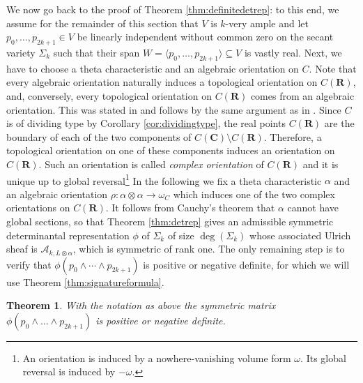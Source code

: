 \documentclass[12pt]{amsart}
\newcounter{thmcounter}
\numberwithin{equation}{section}
\numberwithin{thmcounter}{section}
\newtheorem{theorem}[thmcounter]{Theorem}
\theoremstyle{definition}
\theoremstyle{claim}
\newcommand{\nR}{\mathbf{R}}
\newcommand{\nC}{\mathbf{C}}
\newcommand{\sA}{\mathscr{A}}
\begin{document}
We now go back to the proof of Theorem \ref{thm:definitedetrep}:  to this end, we assume for the remainder of this section that $V$ is $k$-very ample and let $p_0,\ldots,p_{2k+1}\in V$ be linearly independent without common zero on the secant variety $\Sigma_k$ such that their span $W=\langle p_0,\ldots,p_{2k+1} \rangle \subseteq V$ is vastly real. Next, we have to choose a theta characteristic and an algebraic orientation on $C$. Note that every algebraic orientation naturally induces a topological orientation on $C(\nR)$, and, conversely, every topological orientation on $C(\nR)$ comes from an algebraic orientation. This was stated in \cite[Example 4.5]{agostinikummer} and follows by the same argument as in \cite[Corollary 2.4]{tottet}. Since $C$ is of dividing type by Corollary \ref{cor:dividingtype}, the real points $C(\nR)$ are the boundary of each of the two components of $C(\nC)\setminus C(\nR)$. Therefore, a topological orientation on one of these components induces an orientation on $C(\nR)$. Such an orientation is called \emph{complex orientation} of $C(\nR)$ and it is unique up to global reversal\footnote{An orientation is induced by a nowhere-vanishing volume form $\omega$. Its global reversal is induced by $-\omega$.} In the following we fix a theta characteristic $\alpha$ and an algebraic orientation $\rho\colon\alpha\otimes\alpha\to\omega_C$ which induces one of the two complex orientations on $C(\nR)$. It follows from Cauchy's theorem that $\alpha$ cannot have global sections, so that Theorem \ref{thm:detrep} gives an admissible symmetric determinantal representation $\phi$ of $\Sigma_k$ of size $\deg(\Sigma_k)$ whose associated Ulrich sheaf is $\sA_{k,L\otimes\alpha}$, which is symmetric of rank one. The only remaining step is to verify that $\phi(p_0\wedge\cdots\wedge p_{2k+1})$ is positive or negative definite, for which we will use Theorem \ref{thm:signatureformula}.

\begin{theorem}\label{thm:definite}
    With the notation as above the symmetric matrix $\phi(p_0\wedge\dots\wedge p_{2k+1})$ is positive or negative definite.
\end{theorem}
\end{document}
